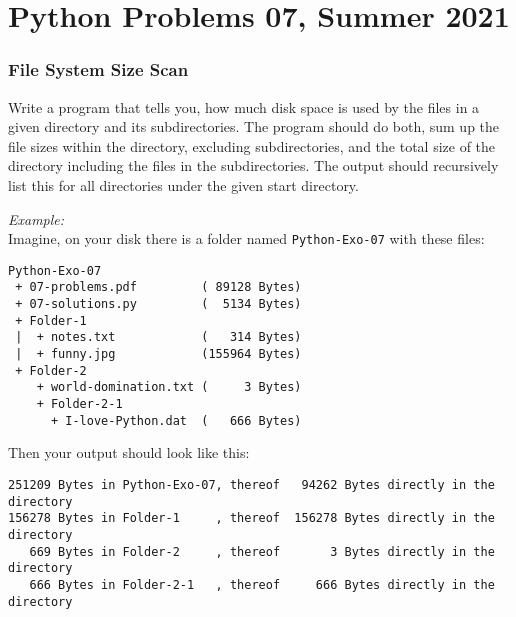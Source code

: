 \documentclass[
	english,
	fontsize=10pt,
	parskip=half,
	titlepage=true,
	DIV=12
]{scrartcl}
\begin{document}
\part*{Python Problems 07, Summer 2021}
\section{File System Size Scan}
Write a program that tells you, how much disk space is used by the files in a given directory and its subdirectories. The program should do both, sum up the file sizes within the directory, excluding subdirectories, and the total size of the directory including the files in the subdirectories. The output should recursively list this for all directories under the given start directory.

\emph{Example:}\\
Imagine, on your disk there is a folder named \texttt{Python-Exo-07} with these files:
\begin{verbatim}
Python-Exo-07
 + 07-problems.pdf         ( 89128 Bytes)
 + 07-solutions.py         (  5134 Bytes)
 + Folder-1
 |  + notes.txt            (   314 Bytes)  
 |  + funny.jpg            (155964 Bytes)
 + Folder-2
    + world-domination.txt (     3 Bytes)
    + Folder-2-1
      + I-love-Python.dat  (   666 Bytes)
\end{verbatim}

Then your output should look like this:
\begin{verbatim}
251209 Bytes in Python-Exo-07, thereof   94262 Bytes directly in the directory
156278 Bytes in Folder-1     , thereof  156278 Bytes directly in the directory
   669 Bytes in Folder-2     , thereof       3 Bytes directly in the directory
   666 Bytes in Folder-2-1   , thereof     666 Bytes directly in the directory
\end{verbatim}
\end{document}
